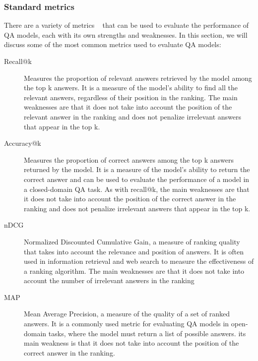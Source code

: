 \documentclass[acmsmall]{acmart}
\begin{document}
\subsubsection{Standard metrics}\label{sec_standard_metrics}
There are a variety of metrics ~\citep{zhaoDenseTextRetrieval2022} that can be used to evaluate the performance of QA models, each with its own strengths and weaknesses. In this section, we will discuss some of the most common metrics used to evaluate QA models:
\begin{description}
\item [Recall@k] Measures the proportion of relevant answers retrieved by the model among the top k answers. It is a measure of the model's ability to find all the relevant answers, regardless of their position in the ranking. The main weaknesses are that it does not take into account the position of the relevant answer in the ranking and does not penalize irrelevant answers that appear in the top k.
\item [Accuracy@k] Measures the proportion of correct answers among the top k answers returned by the model. It is a measure of the model's ability to return the correct answer and can be used to evaluate the performance of a model in a closed-domain QA task. As with recall@k, the main weaknesses are that it does not take into account the position of the correct answer in the ranking and does not penalize irrelevant answers that appear in the top k.
\item [nDCG] Normalized Discounted Cumulative Gain, a measure of ranking quality that takes into account the relevance and position of answers. It is often used in information retrieval and web search to measure the effectiveness of a ranking algorithm. The main weaknesses are that it does not take into account the number of irrelevant answers in the ranking
\item [MAP] Mean Average Precision, a measure of the quality of a set of ranked answers. It is a commonly used metric for evaluating QA models in open-domain tasks, where the model must return a list of possible answers. its main weakness is that it does not take into account the position of the correct answer in the ranking.



\end{description}
\end{document}

